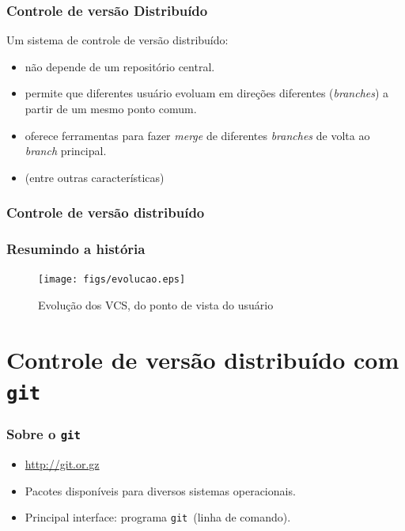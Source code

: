 \documentclass{beamer}
\newcommand{\git}{\texttt{git}}
\begin{document}
\begin{frame}
  \frametitle{Controle de versão Distribuído}

  Um sistema de controle de versão distribuído:

  \begin{itemize}
      \pause
    \item não depende de um repositório central.
      \pause
    \item permite que diferentes usuário evoluam em direções diferentes
      (\emph{branches}) a partir de um mesmo ponto comum.
      \pause
    \item oferece ferramentas para fazer \emph{merge} de diferentes
      \emph{branches} de volta ao \emph{branch} principal.
      \pause
    \item (entre outras características)
  \end{itemize}
\end{frame}

\begin{frame}
  \frametitle{Controle de versão distribuído}
  \begin{figure}[h]
    \begin{center}
    \end{center}
    \label{fig:distributed-vcs}
  \end{figure}
\end{frame}

\begin{frame}
  \frametitle{Resumindo a história}
  \begin{figure}[h]
    \begin{center}
      \texttt{[image: figs/evolucao.eps]}
    \end{center}
    \caption{Evolução dos VCS, do ponto de vista do usuário}
    \label{fig:evolucao}
  \end{figure}
\end{frame}

\section[\git]{Controle de versão distribuído com \git}

\begin{frame}
  \frametitle{Sobre o \git}
  \begin{itemize}
    \item \url{http://git.or.gz}
    \item Pacotes disponíveis para diversos sistemas operacionais.
    \item Principal interface: programa \git\ (linha de comando).
  \end{itemize}
\end{frame}
\end{document}
